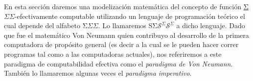 \documentclass[
]{article}
\begin{document}
En esta sección daremos una modelización matemática del concepto de
función
\href{https://granlogico.com/apunteweb/3.1-funciones-sigma-efectivamente-computables.html\#definicion\%20de\%20funcion\%20sigma-efectivamente\%20computable}{{{}\protect\hypertarget{MathJax-Element-3-Frame}{}{\protect\hypertarget{MJXc-Node-13}{}{\protect\hypertarget{MJXc-Node-14}{}{\protect\hypertarget{MJXc-Node-15}{}{{Σ}}}}{\(\Sigma\)}}}}\(\Sigma\)-efectivamente
computable utilizando un lenguaje de programación teórico el cual
depende del alfabeto
{{}\protect\hypertarget{MathJax-Element-4-Frame}{}{\protect\hypertarget{MJXc-Node-16}{}{\protect\hypertarget{MJXc-Node-17}{}{\protect\hypertarget{MJXc-Node-18}{}{{Σ}}}}{\(\Sigma\)}}}\(\Sigma\).
Lo llamaremos
{{}\protect\hypertarget{MathJax-Element-5-Frame}{}{\protect\hypertarget{MJXc-Node-19}{}{\protect\hypertarget{MJXc-Node-20}{}{\protect\hypertarget{MJXc-Node-21}{}{{\protect\hypertarget{MJXc-Node-22}{}{\protect\hypertarget{MJXc-Node-23}{}{\protect\hypertarget{MJXc-Node-24}{}{{S}}}}}{\protect\hypertarget{MJXc-Node-25}{}{\protect\hypertarget{MJXc-Node-26}{}{\protect\hypertarget{MJXc-Node-27}{}{{Σ}}}}}}}}{\(\mathcal{S}^{\Sigma}\)}}}\(\mathcal{S}^{\Sigma}\)
a dicho lenguaje. Dado que fue el matemático Von Neumann quien
contribuyo al desarrollo de la primera computadora de propósito general
(es decir a la cual se le pueden hacer correr programas tal como a las
computadoras actuales), nos referiremos a este paradigma de
computabilidad efectiva como el \emph{paradigma de Von Neumann}. También
lo llamaremos algunas veces el \emph{paradigma imperativo}.
\end{document}
